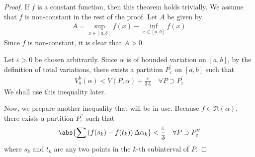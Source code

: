 \documentclass[thmcnt=section, 12pt]{elegantbook}
\begin{document}
\begin{proof}
    \par If $f$ is a constant function, then this theorem holds trivially. We assume that $f$ is non-constant in the rest of the proof. Let $A$ be given by 
    \begin{align*}
        A = \sup_{x \in [a, b]} f(x) - \inf_{x \in [a, b]} f(x)
    \end{align*}
    Since $f$ is non-constant, it is clear that $A > 0$.
    
    \par Let $\varepsilon > 0$ be chosen arbitrarily. Since $\alpha$ is of bounded variation on $[a, b]$, by the definition of total variations, there exists a partition $P^\prime_\varepsilon$ on $[a, b]$ such that 
    \begin{align}
        V_a^b(\alpha) 
        < V(P, \alpha)
        + \frac{\varepsilon}{3A}
        \quad \forall P \supset P^\prime_\varepsilon
        \label{eq:86}
    \end{align}
    We shall use this inequality later.

    \par Now, we prepare another inequality that will be in use. Because $f \in \mathfrak{R}(\alpha)$, there exists a partition $P^{\prime\prime}_\varepsilon$ such that
    \begin{align}
        \abs{
            \sum \left(f(s_k) - f(t_k)\right) 
            \Delta \alpha_k
        } < \frac{\varepsilon}{3}
        \quad \forall P \supset P^{\prime\prime}_\varepsilon
        \label{eq:87}
    \end{align}
    where $s_k$ and $t_k$ are any two points in the $k$-th subinterval of $P$.


\end{proof}
\end{document}
